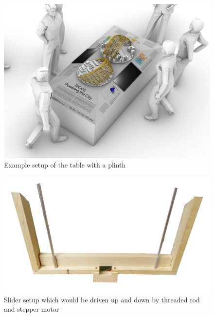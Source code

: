 \documentclass[a4paper,9pt]{article}
\begin{document}
    \begin{minipage}{0.48\linewidth}
       \begin{figure}[H]
        \centering
        \includegraphics[width=\linewidth]{Images/table_1.jpg}
        \caption{Example setup of the table with a plinth}
        \label{table}
    \end{figure}
    \end{minipage}
    \hfill
    \begin{minipage}{0.48\linewidth}
       \begin{figure}[H]
        \centering
        \includegraphics[width=\linewidth]{Images/Slider_1.jpg}
        \caption{Slider setup which would be driven up and down by threaded rod and stepper motor}
        \label{setupp}
    \end{figure}
    \end{minipage}
    
\end{document}
